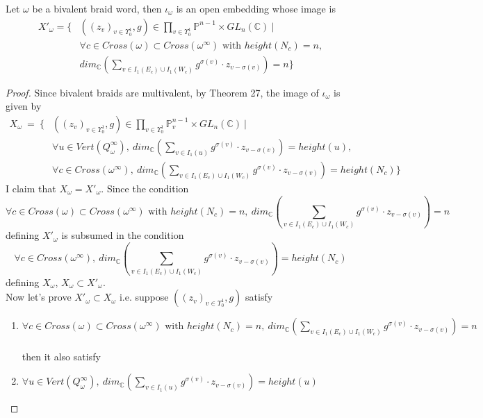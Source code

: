 \begin{theorem}
	Let $\omega$ be a bivalent braid word, then $\iota_\omega$ is an open embedding whose image is 
\begin{align*}
X'_\omega =\{ &((z_v)_{v\in\Upsilon_0^1},g)\in \prod_{v\in \Upsilon_0^1} \mathbb{P}^{n-1} \times GL_n(\mathbb{C})~|\\
&\forall c\in Cross(\omega)\subset Cross(\omega^\infty)\text{ with } height(N_c)=n,\\
& dim_\mathbb{C}(\sum_{v\in I_1(E_c)\cup I_1(W_c)}g^{\sigma(v)}\cdot z_{v-\sigma(v)}) = n\}
\end{align*}
\end{theorem}
\begin{proof}
Since bivalent braids are multivalent, by Theorem 27, the image of $\iota_\omega$ is given by 
\begin{align*}
X_\omega~=~\{ &((z_v)_{v\in \Upsilon_0^1},g)\in \prod_{v\in\Upsilon_0^1}\mathbb{P}_v^{n-1}\times GL_n(\mathbb{C})~|\\
& \forall u\in Vert(Q_\omega^\infty),~dim_\mathbb{C}(\sum_{v\in I_1(u)} g^{\sigma(v)}\cdot z_{v-\sigma(v)}) = height(u),\\
& \forall c\in Cross(\omega^\infty),~dim_\mathbb{C}(\sum_{v\in I_1(E_c)\cup I_1(W_c)} g^{\sigma(v)}\cdot z_{v-\sigma(v)}) = height(N_c)\}
\end{align*}
I claim that $X_\omega = X'_\omega$. Since the condition
\[
\forall c\in Cross(\omega)\subset Cross(\omega^\infty)\text{ with } height(N_c)=n, ~ dim_\mathbb{C}(\sum_{v\in I_1(E_c)\cup I_1(W_c)}g^{\sigma(v)}\cdot z_{v-\sigma(v)}) = n
\]
defining $X'_\omega$ is subsumed in the condition
\[
\forall c\in Cross(\omega^\infty),~dim_\mathbb{C}(\sum_{v\in I_1(E_c)\cup I_1(W_c)} g^{\sigma(v)}\cdot z_{v-\sigma(v)}) = height(N_c)
\]
defining $X_\omega$, $X_\omega \subset X'_\omega$.\\
Now let's prove $X'_\omega \subset X_\omega$ i.e. suppose $((z_v)_{v\in \Upsilon_0^1},g)$ satisfy
\begin{enumerate}[label = (\roman*)]
\item $\forall c\in Cross(\omega)\subset Cross(\omega^\infty)\text{ with } height(N_c)=n, ~ dim_\mathbb{C}(\sum_{v\in I_1(E_c)\cup I_1(W_c)}g^{\sigma(v)}\cdot z_{v-\sigma(v)}) = n$\\
\\
then it also satisfy\\
\item $\forall u\in Vert(Q_\omega^\infty),~dim_\mathbb{C}(\sum_{v\in I_1(u)} g^{\sigma(v)}\cdot z_{v-\sigma(v)}) = height(u)$

\end{enumerate}
\end{proof}
